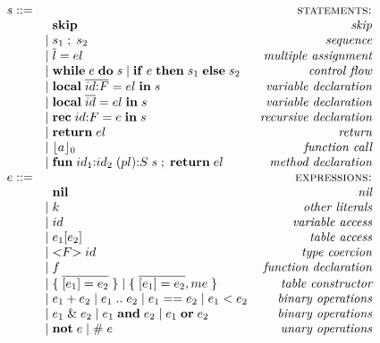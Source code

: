 \documentclass[10pt]{sigplanconf}
\begin{document}
\begin{figure}[t]
{\scriptsize
	$$
	\begin{array}{rlr}
	s ::= & & \textsc{statements:}\\
	& \;\; \mathbf{skip} & \textit{skip}\\
	& | \; s_{1} \; ; \; s_{2} & \textit{sequence}\\
	& | \; \overline{l} = el & \textit{multiple assignment}\\
	& | \; \mathbf{while} \; e \; \mathbf{do} \; s \;
	| \; \mathbf{if} \; e \; \mathbf{then} \; s_{1} \; \mathbf{else} \; s_{2} & \textit{control flow}\\
	& | \; \mathbf{local} \; \overline{id{:}F} = el \; \mathbf{in} \; s & \textit{variable declaration}\\
	& | \; \mathbf{local} \; \overline{id} = el \; \mathbf{in} \; s & \textit{variable declaration}\\
	& | \; \mathbf{rec} \; id{:}F = e \; \mathbf{in} \; s & \textit{recursive declaration} \\
	& | \; \mathbf{return} \; el & \textit{return} \\
	& | \; \lfloor a \rfloor_{0} & \textit{function call}\\
	& | \; \mathbf{fun} \; id_{1}{:}id_{2} \; (pl){:}S \; s \;;\; \mathbf{return} \; el & \textit{method declaration}\\
	e ::= & & \textsc{expressions:}\\
	& \;\; \mathbf{nil} & \textit{nil}\\
	& | \; k & \textit{other literals}\\
	& | \; id & \textit{variable access}\\
	& | \; e_{1}[e_{2}] & \textit{table access}\\
	& | \; {<}F{>} \; id & \textit{type coercion}\\
	& | \; f & \textit{function declaration}\\
	& | \; \{ \; \overline{[e_{1}] = e_{2}} \; \} \;
	| \; \{ \; \overline{[e_{1}] = e_{2}},me \; \} & \textit{table constructor}\\
	& | \; e_{1} + e_{2} \;
	| \; e_{1} \; {..} \; e_{2} \;
	| \; e_{1} == e_{2} \;
	| \; e_{1} < e_{2} & \textit{binary operations}\\
	& | \; e_{1} \;\&\; e_{2} \;
	| \; e_{1} \; \mathbf{and} \; e_{2} \;
	| \; e_{1} \; \mathbf{or} \; e_{2} & \textit{binary operations}\\
	& | \; \mathbf{not} \; e \;
	| \; \# \; e & \textit{unary operations} \\

\end{array}$$}
\end{figure}
\end{document}
